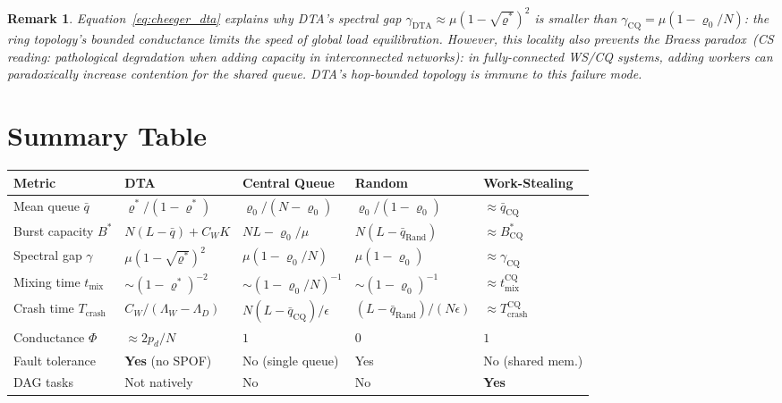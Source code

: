 \documentclass[11pt,a4paper]{article}
\newtheorem{remark}{Remark}[section]
\newcommand{\physics}[2]{#1\ \textnormal{(\emph{CS reading}: #2)}}
\begin{document}
\begin{remark}
Equation~\eqref{eq:cheeger_dta} explains why DTA's spectral gap
$\gamma_{\mathrm{DTA}} \approx \mu(1-\sqrt{\varrho^*})^2$ is smaller than
$\gamma_{\mathrm{CQ}} = \mu(1-\varrho_0/N)$: the ring topology's bounded conductance
limits the speed of global load equilibration.  However, this \emph{locality}
also prevents the \physics{Braess paradox}{pathological degradation when adding
capacity in interconnected networks}: in fully-connected WS/CQ systems,
adding workers can paradoxically increase contention for the shared queue.
DTA's hop-bounded topology is immune to this failure mode.
\end{remark}

\section{Summary Table}

\begin{center}
\renewcommand{\arraystretch}{1.4}
\begin{tabularx}{\textwidth}{@{}lXXXX@{}}
\toprule
Metric & DTA & Central Queue & Random & Work-Stealing \\
\midrule
Mean queue $\bar q$
  & $\varrho^*/(1-\varrho^*)$
  & $\varrho_0/(N-\varrho_0)$
  & $\varrho_0/(1-\varrho_0)$
  & $\approx \bar q_{\mathrm{CQ}}$ \\
Burst capacity $B^*$
  & $N(L-\bar q)+C_W K$
  & $NL - \varrho_0/\mu$
  & $N(L-\bar q_{\mathrm{Rand}})$
  & $\approx B^*_{\mathrm{CQ}}$ \\
Spectral gap $\gamma$
  & $\mu(1-\sqrt{\varrho^*})^2$
  & $\mu(1-\varrho_0/N)$
  & $\mu(1-\varrho_0)$
  & $\approx \gamma_{\mathrm{CQ}}$ \\
Mixing time $t_{\mathrm{mix}}$
  & $\sim(1-\varrho^*)^{-2}$
  & $\sim(1-\varrho_0/N)^{-1}$
  & $\sim(1-\varrho_0)^{-1}$
  & $\approx t_{\mathrm{mix}}^{\mathrm{CQ}}$ \\
Crash time $T_{\mathrm{crash}}$
  & $C_W/(\Lambda_W-\Lambda_D)$
  & $N(L-\bar q_{\mathrm{CQ}})/\epsilon$
  & $(L-\bar q_{\mathrm{Rand}})/(N\epsilon)$
  & $\approx T_{\mathrm{crash}}^{\mathrm{CQ}}$ \\
Conductance $\Phi$
  & $\approx 2p_d/N$
  & $1$
  & $0$
  & $1$ \\
Fault tolerance
  & \textbf{Yes} (no SPOF)
  & No (single queue)
  & Yes
  & No (shared mem.) \\
DAG tasks
  & Not natively
  & No
  & No
  & \textbf{Yes} \\
\bottomrule
\end{tabularx}
\end{center}
\end{document}
